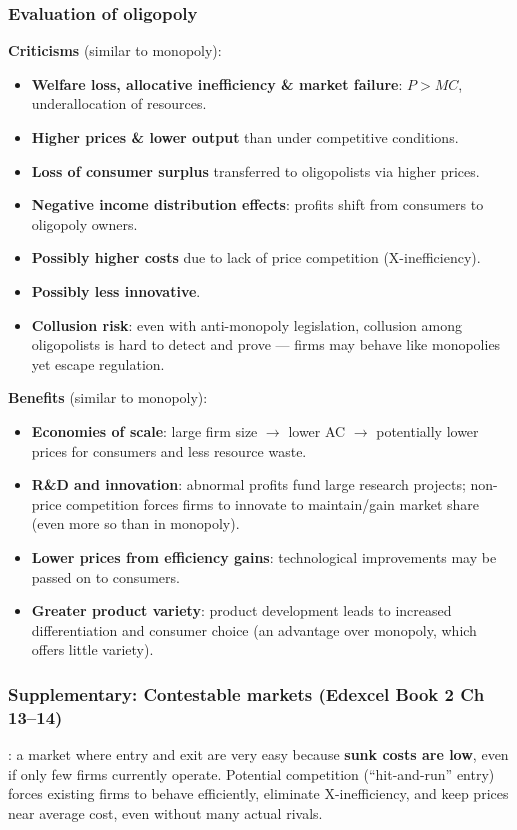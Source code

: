 \subsubsection*{Evaluation of oligopoly}
\textbf{Criticisms} (similar to monopoly):
\begin{itemize}
  \item \textbf{Welfare loss, allocative inefficiency \& market failure}: $P > MC$, underallocation of resources.
  \item \textbf{Higher prices \& lower output} than under competitive conditions.
  \item \textbf{Loss of consumer surplus} transferred to oligopolists via higher prices.
  \item \textbf{Negative income distribution effects}: profits shift from consumers to oligopoly owners.
  \item \textbf{Possibly higher costs} due to lack of price competition (X-inefficiency).
  \item \textbf{Possibly less innovative}.
  \item \textbf{Collusion risk}: even with anti-monopoly legislation, collusion among oligopolists is hard to detect and prove --- firms may behave like monopolies yet escape regulation.
\end{itemize}
\textbf{Benefits} (similar to monopoly):
\begin{itemize}
  \item \textbf{Economies of scale}: large firm size $\to$ lower AC $\to$ potentially lower prices for consumers and less resource waste.
  \item \textbf{R\&D and innovation}: abnormal profits fund large research projects; non-price competition forces firms to innovate to maintain/gain market share (even more so than in monopoly).
  \item \textbf{Lower prices from efficiency gains}: technological improvements may be passed on to consumers.
  \item \textbf{Greater product variety}: product development leads to increased differentiation and consumer choice (an advantage over monopoly, which offers little variety).
\end{itemize}
\subsubsection*{Supplementary: Contestable markets (Edexcel Book 2 Ch 13--14)}
: a market where entry and exit are very easy because \textbf{sunk costs are low}, even if only few firms currently operate. Potential competition (``hit-and-run'' entry) forces existing firms to behave efficiently, eliminate X-inefficiency, and keep prices near average cost, even without many actual rivals.
